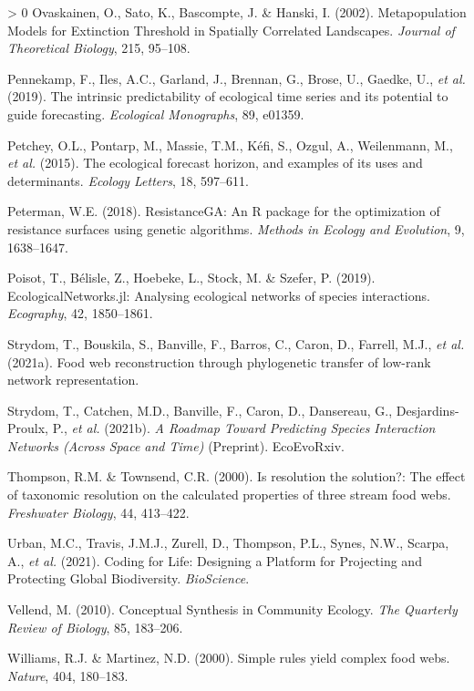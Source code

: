 \documentclass[10pt,oneside]{article}
\newlength{\cslhangindent}
\newenvironment{CSLReferences}[3] %
 {%
  \setlength{\parindent}{0pt}
  \ifodd #1 \everypar{\setlength{\hangindent}{\cslhangindent}}\ignorespaces\fi
  \ifnum #2 > 0
  \setlength{\parskip}{#2\baselineskip}
  \fi
 }%
 {}
\begin{document}
\begin{CSLReferences}{1}{0}
\leavevmode\hypertarget{ref-Ovaskainen2002MetMod}{}%
Ovaskainen, O., Sato, K., Bascompte, J. \& Hanski, I. (2002).
Metapopulation Models for Extinction Threshold in Spatially Correlated
Landscapes. \emph{Journal of Theoretical Biology}, 215, 95--108.

\leavevmode\hypertarget{ref-Pennekamp2019IntPre}{}%
Pennekamp, F., Iles, A.C., Garland, J., Brennan, G., Brose, U., Gaedke,
U., \emph{et al.} (2019). The intrinsic predictability of ecological
time series and its potential to guide forecasting. \emph{Ecological
Monographs}, 89, e01359.

\leavevmode\hypertarget{ref-Petchey2015EcoFor}{}%
Petchey, O.L., Pontarp, M., Massie, T.M., Kéfi, S., Ozgul, A.,
Weilenmann, M., \emph{et al.} (2015). The ecological forecast horizon,
and examples of its uses and determinants. \emph{Ecology Letters}, 18,
597--611.

\leavevmode\hypertarget{ref-Peterman2018ResRP}{}%
Peterman, W.E. (2018). ResistanceGA: An R package for the optimization
of resistance surfaces using genetic algorithms. \emph{Methods in
Ecology and Evolution}, 9, 1638--1647.

\leavevmode\hypertarget{ref-Poisot2019EcoJl}{}%
Poisot, T., Bélisle, Z., Hoebeke, L., Stock, M. \& Szefer, P. (2019).
EcologicalNetworks.jl: Analysing ecological networks of species
interactions. \emph{Ecography}, 42, 1850--1861.

\leavevmode\hypertarget{ref-Strydom2021FooWeb}{}%
Strydom, T., Bouskila, S., Banville, F., Barros, C., Caron, D., Farrell,
M.J., \emph{et al.} (2021a). Food web reconstruction through
phylogenetic transfer of low-rank network representation.

\leavevmode\hypertarget{ref-Strydom2021RoaPre}{}%
Strydom, T., Catchen, M.D., Banville, F., Caron, D., Dansereau, G.,
Desjardins-Proulx, P., \emph{et al.} (2021b). \emph{A Roadmap Toward
Predicting Species Interaction Networks (Across Space and Time)}
(Preprint). EcoEvoRxiv.

\leavevmode\hypertarget{ref-Thompson2000ResSol}{}%
Thompson, R.M. \& Townsend, C.R. (2000). Is resolution the solution?:
The effect of taxonomic resolution on the calculated properties of three
stream food webs. \emph{Freshwater Biology}, 44, 413--422.

\leavevmode\hypertarget{ref-Urban2021CodLif}{}%
Urban, M.C., Travis, J.M.J., Zurell, D., Thompson, P.L., Synes, N.W.,
Scarpa, A., \emph{et al.} (2021). Coding for Life: Designing a Platform
for Projecting and Protecting Global Biodiversity. \emph{BioScience}.

\leavevmode\hypertarget{ref-Vellend2010ConSyn}{}%
Vellend, M. (2010). Conceptual Synthesis in Community Ecology. \emph{The
Quarterly Review of Biology}, 85, 183--206.

\leavevmode\hypertarget{ref-Williams2000SimRul}{}%
Williams, R.J. \& Martinez, N.D. (2000). Simple rules yield complex food
webs. \emph{Nature}, 404, 180--183.

\end{CSLReferences}
\end{document}
